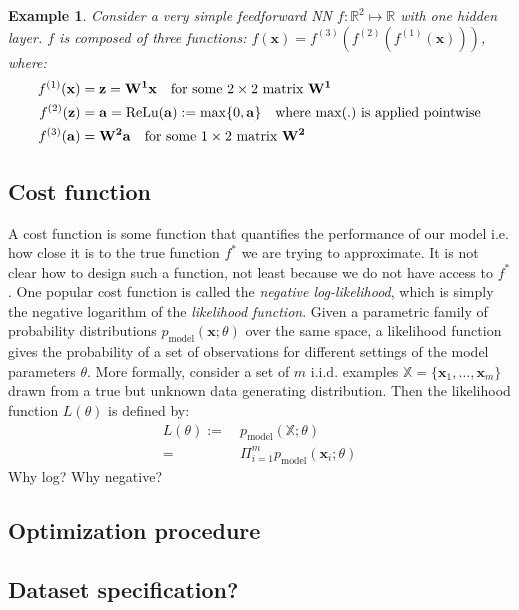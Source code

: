 \documentclass[11pt, a4paper, bibliography=totoc]{report}
\newcommand{\reals}{\mathbb{R}}
\newcommand{\x}{\mathbf{x}}
\newtheorem{example}{Example}
\begin{document}
\begin{example}
Consider a very simple feedforward NN $ f : \reals^2 \mapsto \reals $ with one hidden layer. $ f $ is composed of three functions: $ f(\x) = f^{(3)}(f^{(2)}(f^{(1)}(\x))) $, where:
\begin{align*}
	f^{(1)}(\x) &= \mathbf{z} = \mathbf{W^1}\x \quad \text{for some $ 2\times 2 $ matrix $ \mathbf{W^1} $} \\
	f^{(2)}(\mathbf{z}) &= \mathbf{a} = \textup{ReLu}(\mathbf{a}) := \max\{0,\mathbf{a} \} \quad \text{where $ \max(.) $ is applied pointwise} \\
	f^{(3)}(\mathbf{a}) &= \mathbf{W^2}\mathbf{a} \quad \text{for some $ 1 \times 2 $ matrix $ \mathbf{W^2} $}
\end{align*}
\end{example}

\subsection{Cost function}
A cost function is some function that quantifies the performance of our model i.e. how close it is to the true function $ f^* $ we are trying to approximate. It is not clear how to design such a function, not least because we do not have access to $ f^* $. One popular cost function is called the \textit{negative log-likelihood}, which is simply the negative logarithm of the \textit{likelihood function}. Given a parametric family of probability distributions $ p_{\text{model}}(\x ; \theta) $ over the same space, a likelihood function gives the probability of a set of observations for different settings of the model parameters $ \theta $. More formally, consider a set of $ m $ i.i.d. examples $ \mathbb{X} = \{\x_1, \dots, \x_m \} $ drawn from a true but unknown data generating distribution. Then the likelihood function $ L(\theta) $ is defined by:
\begin{align*}\label{eq:lik}
L(\theta) :=&~ p_{\text{model}}(\mathbb{X} ; \theta) \\
	=&~ \Pi_{i=1}^m p_{\text{model}}(\x_i ; \theta)
\end{align*}
Why log?
Why negative?

\subsection{Optimization procedure}

\subsection{Dataset specification?}
\end{document}
